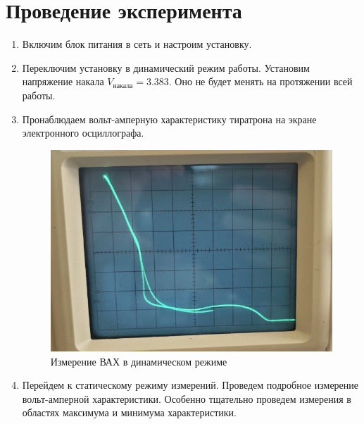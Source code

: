 \documentclass[14pt, a4paper]{report}
\begin{document}
\section{Проведение эксперимента}

\begin{enumerate}

\item Включим блок питания в сеть и настроим установку.

\item Переключим установку в динамический режим работы. Установим напряжение накала $V_{накала}=3.383$. Оно не будет менять на протяжении всей работы.

\item Пронаблюдаем вольт-амперную характеристику тиратрона на экране электронного осциллографа.

\begin{figure}[H]
\centering
\includegraphics[scale=0.6]{../images/513-7}
\caption{Измерение ВАХ в динамическом режиме}
\end{figure}

\item Перейдем к статическому режиму измерений. Проведем подробное измерение вольт-амперной характеристики. Особенно тщательно проведем измерения в областях максимума и минимума характеристики.


\end{enumerate}
\end{document}
